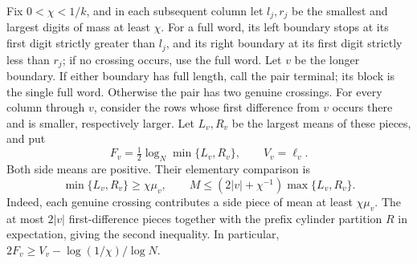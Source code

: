 \documentclass[11pt]{article}
\numberwithin{equation}{section}
\theoremstyle{definition}
\theoremstyle{remark}
\newcommand{\1}{\mathbf 1}
\begin{document}
Fix $0<\chi<1/k$, and in each subsequent column let $l_j,r_j$ be the
smallest and largest digits of mass at least $\chi$. For a full word,
its left boundary stops at its first digit strictly greater than $l_j$,
and its right boundary at its first digit strictly less than $r_j$;
if no crossing occurs, use the full word. Let $v$ be the longer
boundary. If either boundary has full length, call the pair terminal;
its block is the single full word. Otherwise the pair has two genuine
crossings. For every column through $v$, consider the rows whose first
difference from $v$ occurs there and is smaller, respectively larger.
Let $L_v,R_v$ be the largest means of these pieces, and put
\[
 F_v=\tfrac12\log_N\min\{L_v,R_v\},\qquad V_v=\ell_v.
\]
Both side means are positive. Their elementary comparison is
\begin{equation}\label{eq:upper-side-scale}
 \min\{L_v,R_v\}\ge\chi\mu_v,\qquad
 M\le(2|v|+\chi^{-1})\max\{L_v,R_v\}.
\end{equation}
Indeed, each genuine crossing contributes a side piece of mean at
least $\chi\mu_v$. The at most $2|v|$ first-difference pieces together
with the prefix cylinder partition $R$ in expectation, giving the
second inequality. In particular,
$2F_v\ge V_v-\log(1/\chi)/\log N$.
\end{document}
